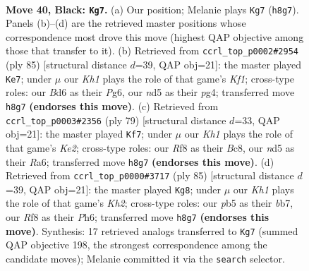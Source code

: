 \documentclass[11pt]{article}
\begin{document}
\clearpage

\begin{figure}[p]\centering
\begin{subfigure}{0.46\textwidth}\centering
\resizebox{\linewidth}{!}{%
\newchessgame
\chessboard[
  setfen={5r1k/p7/P2b2PN/1P1N1p2/8/8/3K4/R1B5 b - - 0 40},
  showmover=false,
  pgfstyle=straightmove, color=movearrow, markmove={h8-g7}
]}
\caption{}
\end{subfigure}\hfill
\begin{subfigure}{0.46\textwidth}\centering
\resizebox{\linewidth}{!}{%
\newchessgame
\chessboard[
  setfen={5k2/1N6/2r1p1p1/p7/6P1/5P2/P3R1K1/2b5 b - - 3 43},
  showmover=false,
  pgfstyle=straightmove, color=movearrow, markmove={f8-e7}
]}
\caption{}
\end{subfigure}
\\[4pt]
\begin{subfigure}{0.46\textwidth}\centering
\resizebox{\linewidth}{!}{%
\newchessgame
\chessboard[
  setfen={2b5/4k2p/r7/3R1p2/p2B3P/P2K1P2/1P6/8 b - - 0 40},
  showmover=false,
  pgfstyle=straightmove, color=movearrow, markmove={e7-f7}
]}
\caption{}
\end{subfigure}\hfill
\begin{subfigure}{0.46\textwidth}\centering
\resizebox{\linewidth}{!}{%
\newchessgame
\chessboard[
  setfen={8/pB5k/4N2p/6pP/1n4P1/5R1K/1r6/1b6 b - - 1 43},
  showmover=false,
  pgfstyle=straightmove, color=movearrow, markmove={h7-g8}
]}
\caption{}
\end{subfigure}
\caption{\textbf{Move 40, Black: \texttt{Kg7}.} (a) Our position; Melanie plays \texttt{Kg7} (\texttt{h8g7}). Panels (b)--(d) are the retrieved master positions whose correspondence most drove this move (highest QAP objective among those that transfer to it). (b) Retrieved from \texttt{ccrl\_top\_p0002\#2954} (ply 85) [structural distance $d$=39, QAP obj=21]: the master played \texttt{Ke7}; under $\mu$ our \emph{Kh1} plays the role of that game's \emph{Kf1}; cross-type roles: our \emph{B}d6 as their \emph{P}g6, our \emph{n}d5 as their \emph{p}g4; transferred move \texttt{h8g7} \textbf{(endorses this move)}. (c) Retrieved from \texttt{ccrl\_top\_p0003\#2356} (ply 79) [structural distance $d$=33, QAP obj=21]: the master played \texttt{Kf7}; under $\mu$ our \emph{Kh1} plays the role of that game's \emph{Ke2}; cross-type roles: our \emph{R}f8 as their \emph{B}c8, our \emph{n}d5 as their \emph{R}a6; transferred move \texttt{h8g7} \textbf{(endorses this move)}. (d) Retrieved from \texttt{ccrl\_top\_p0000\#3717} (ply 85) [structural distance $d$=39, QAP obj=21]: the master played \texttt{Kg8}; under $\mu$ our \emph{Kh1} plays the role of that game's \emph{Kh2}; cross-type roles: our \emph{p}b5 as their \emph{b}b7, our \emph{R}f8 as their \emph{P}h6; transferred move \texttt{h8g7} \textbf{(endorses this move)}. Synthesis: 17 retrieved analogs transferred to \texttt{Kg7} (summed QAP objective 198, the strongest correspondence among the candidate moves); Melanie committed it via the \texttt{search} selector.}
\label{fig:thought-m79}
\end{figure}
\end{document}
